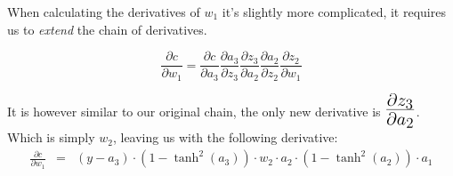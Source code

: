 \begin{flushleft}
                    \vspace{0.2cm}

                    When calculating the derivatives of $w_1$ it's slightly more complicated, it requires us to \textit{extend}
                    the chain of derivatives.

                    \[\frac{\partial c}{\partial w_1} = \frac{\partial c}{\partial a_3} \frac{\partial a_3}{\partial z_3} \frac{\partial z_3}{\partial a_2} \frac{\partial a_2}{\partial z_2} \frac{\partial z_2}{\partial w_1}\]

                    It is however similar to our original chain, the only new derivative is $\mathLarge{\frac{\partial z_3}{\partial a_2}}$.
                    Which is simply $w_2$, leaving us with the following derivative:
                    \begin{eqnarray*}
                        \frac{\partial c}{\partial w_{1}} &=& (y - a_3) \cdot (1 - \tanh^{2}(a_3)) \cdot w_2 \cdot a_2 \cdot (1 - \tanh^{2}(a_2)) \cdot a_1
                    \end{eqnarray*}
\end{flushleft}